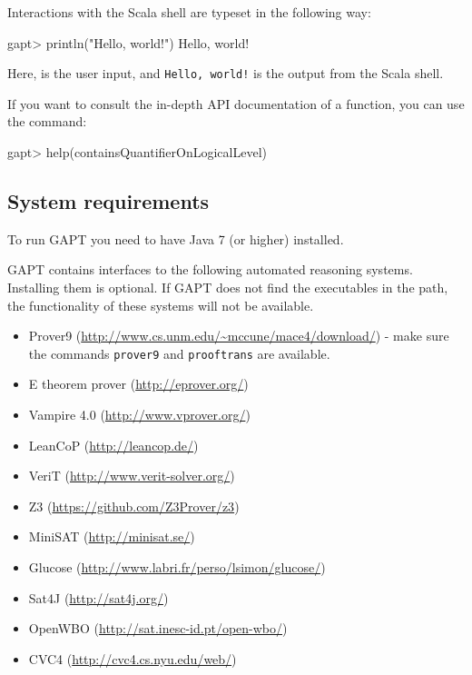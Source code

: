 \documentclass[a4paper,11pt]{article}
\newcommand{\cli}[1]{{\ttfamily {#1}}}
\begin{document}
Interactions with the Scala shell are typeset in the following way:
\begin{clilisting}
gapt> println("Hello, world!")
Hello, world!

\end{clilisting}
Here, {\bfseries \cli{println("Hello, world!")}} is the user input, and \texttt{Hello,
world!} is the output from the Scala shell.

If you want to consult the in-depth API documentation of a function, you can
use the \cli{help} command:
\begin{clilisting}
gapt> help(containsQuantifierOnLogicalLevel)

\end{clilisting}

\subsection{System requirements}
\label{sec:sysreq}

To run GAPT you need to have Java 7 (or higher) installed.

GAPT contains interfaces to the following automated reasoning systems. Installing
them is optional. If GAPT does not find the executables in the path, the
functionality of these systems will not be available.

\begin{itemize}
\item Prover9 (\url{http://www.cs.unm.edu/~mccune/mace4/download/}) - make sure
  the commands \texttt{prover9} and \texttt{prooftrans} are available.
\item E theorem prover (\url{http://eprover.org/})
\item Vampire 4.0 (\url{http://www.vprover.org/})
\item LeanCoP (\url{http://leancop.de/})
\item VeriT (\url{http://www.verit-solver.org/})
\item Z3 (\url{https://github.com/Z3Prover/z3})
\item MiniSAT (\url{http://minisat.se/})
\item Glucose (\url{http://www.labri.fr/perso/lsimon/glucose/})
\item Sat4J (\url{http://sat4j.org/})
\item OpenWBO (\url{http://sat.inesc-id.pt/open-wbo/})
\item CVC4 (\url{http://cvc4.cs.nyu.edu/web/})
\end{itemize}
\end{document}
